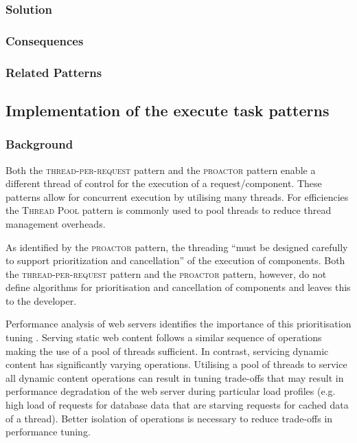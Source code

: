 \documentclass[prodmode]{style/acmlarge}
\begin{document}
\subsubsection*{Solution}

\subsubsection*{Consequences}

\subsubsection*{Related Patterns}



\subsection{Implementation of the execute task patterns}

\subsubsection*{Background}

Both the \textsc{thread-per-request} pattern \cite{thread-per-request} and the
\textsc{proactor} pattern \cite{proactor} enable a different thread of control
for the execution of a request/component.  These patterns allow for concurrent
execution by utilising many threads.  For efficiencies the \textsc{Thread Pool}
pattern \cite{thread-per-request} is commonly used to pool threads to reduce
thread management overheads.

As identified by the \textsc{proactor} pattern, the threading ``must be designed
carefully to support prioritization and cancellation'' \cite[p. 8]{proactor} of
the execution of components.  Both the \textsc{thread-per-request} pattern and
the \textsc{proactor} pattern, however, do not define algorithms for
prioritisation and cancellation of components and leaves this to the developer.

Performance analysis of web servers identifies the importance of this
prioritisation tuning
\cite{tuning-important,low-server-footprint,tuning-os-important}.
Serving static web content follows a similar sequence of operations making the
use of a pool of threads sufficient.  In contrast, servicing dynamic content has
significantly varying operations.  Utilising a pool of threads to service all
dynamic content operations can result in tuning trade-offs that may result in
performance degradation of the web server during particular load profiles (e.g.
high load of requests for database data that are starving requests for cached
data of a thread).  Better isolation of operations is necessary to reduce
trade-offs in performance tuning.
\end{document}
